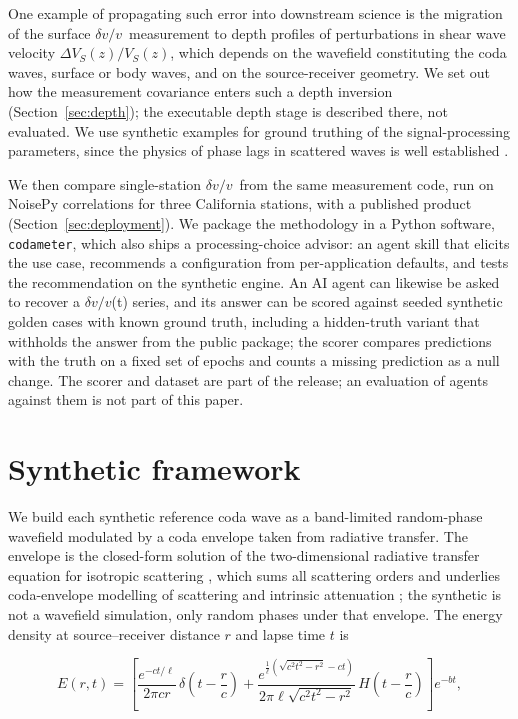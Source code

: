\documentclass[
  referee]{gji}
\providecommand{\dvv}{\ensuremath{\delta v/v}}
\begin{document}
One example of propagating such error into downstream science is the
migration of the surface \dvv~measurement to depth profiles of
perturbations in shear wave velocity \(\Delta V_S(z)/V_S(z)\), which
depends on the wavefield constituting the coda waves, surface or body
waves, and on the source-receiver geometry. We set out how the
measurement covariance enters such a depth inversion
(Section~\ref{sec:depth}); the executable depth stage is described
there, not evaluated. We use synthetic examples for ground truthing of
the signal-processing parameters, since the physics of phase lags in
scattered waves is well established \citep{Obermann2013}.

We then compare single-station \dvv~from the same measurement code, run
on NoisePy correlations \citep{Jiang2020} for three California stations,
with a published product (Section~\ref{sec:deployment}). We package the
methodology in a Python software, \texttt{codameter}, which also ships a
processing-choice advisor: an agent skill that elicits the use case,
recommends a configuration from per-application defaults, and tests the
recommendation on the synthetic engine. An AI agent can likewise be
asked to recover a \dvv(t) series, and its answer can be scored against
seeded synthetic golden cases with known ground truth, including a
hidden-truth variant that withholds the answer from the public package;
the scorer compares predictions with the truth on a fixed set of epochs
and counts a missing prediction as a null change. The scorer and dataset
are part of the release; an evaluation of agents against them is not
part of this paper.

\section{Synthetic framework}\label{sec:methods}

We build each synthetic reference coda wave as a band-limited
random-phase wavefield modulated by a coda envelope taken from radiative
transfer. The envelope is the closed-form solution of the
two-dimensional radiative transfer equation for isotropic scattering
\citep{Sato1993, Paasschens1997}, which sums all scattering orders and
underlies coda-envelope modelling of scattering and intrinsic
attenuation \citep{Margerin1998}; the synthetic is not a wavefield
simulation, only random phases under that envelope. The energy density
at source--receiver distance \(r\) and lapse time \(t\) is

\begin{linenomath*}
\begin{equation}
E(r,t)=\left[\frac{e^{-ct/\ell}}{2\pi c r}\,\delta\!\left(t-\frac{r}{c}\right) +
\frac{e^{\frac{1}{\ell}\left(\sqrt{c^2 t^2-r^2}-ct\right)}}{2\pi \ell\sqrt{c^2 t^2-r^2}}\,
H\!\left(t-\frac{r}{c}\right)\right] e^{-b t},
\label{eq:rt2d}
\end{equation}
\end{linenomath*}
\end{document}
